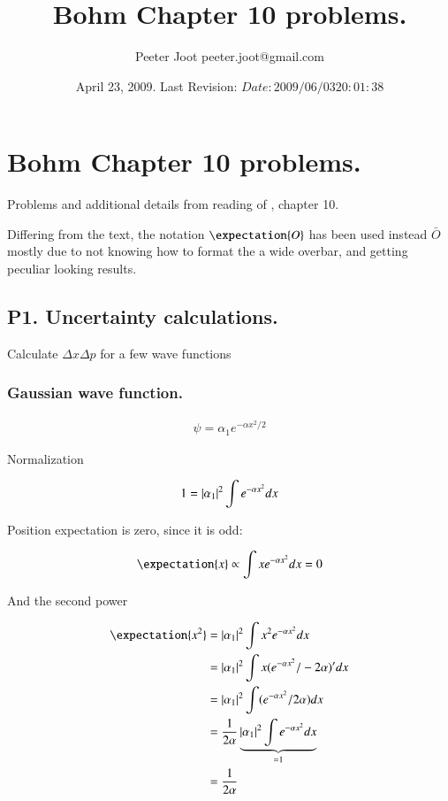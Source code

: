 \documentclass{article}
\title{ Bohm Chapter 10 problems. }
\author{Peeter Joot \quad peeter.joot@gmail.com }
\date{ April 23, 2009.  Last Revision: $Date: 2009/06/03 20:01:38 $ }
\begin{document}
\maketitle{}
\tableofcontents
\section{Bohm Chapter 10 problems. }

Problems and additional details from reading of \cite{bohm1989qt}, chapter 10.

Differing from the text, the notation $\expectation{O}$ has been used instead $\bar{O}$ mostly due to not knowing how to format the a wide overbar, and getting peculiar looking results.

\subsection{P1. Uncertainty calculations. }

Calculate $\Delta x \Delta p$ for a few wave functions

\subsubsection{Gaussian wave function. }

\begin{align*}
\psi = \alpha_1 e^{-\alpha x^2/2}
\end{align*}

Normalization

\begin{align*}
1 
&= \left\lvert{\alpha_1}\right\rvert^2 \int e^{-\alpha x^2} dx \\
\end{align*}

Position expectation is zero, since it is odd:

\begin{align*}
\expectation{x} \propto \int x e^{-\alpha x^2} dx = 0
\end{align*}

And the second power

\begin{align*}
\expectation{x^2} 
&= \Abs{\alpha_1}^2 \int x^2 e^{-\alpha x^2} dx \\
&= \Abs{\alpha_1}^2 \int x (e^{-\alpha x^2}/-2\alpha)' dx \\
&= \Abs{\alpha_1}^2 \int (e^{-\alpha x^2}/2\alpha) dx \\
&= \inv{2\alpha} \underbrace{\Abs{\alpha_1}^2 \int e^{-\alpha x^2} dx}_{=1} \\
&= \inv{2\alpha}
\end{align*}
\end{document}
